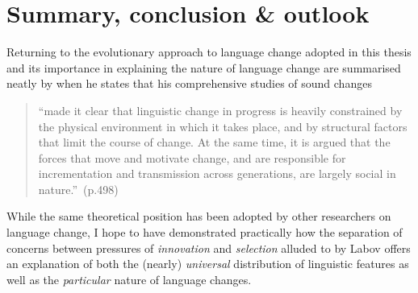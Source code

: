 





\section{Summary, conclusion \& outlook}\label{sec:conclusion}

Returning to the evolutionary approach to language change adopted in this thesis and its importance in explaining the nature of language change are summarised neatly by \citet{Labov2001} when he states that his comprehensive studies of sound changes

\begin{quote}
``made it clear that linguistic change in progress is heavily constrained by the physical environment in which it takes place, and by structural factors that limit the course of change. At the same time, it is argued that the forces that move and motivate change, and are responsible for incrementation and transmission across generations, are largely social in nature.''~(p.498)
\end{quote}

While the same theoretical position has been adopted by other researchers on language change, %
I hope to have demonstrated practically how the separation of concerns between pressures of \emph{innovation} and \emph{selection} alluded to by Labov offers an explanation of both the (nearly) \emph{universal} distribution of linguistic features as well as the \emph{particular} nature of language changes.

